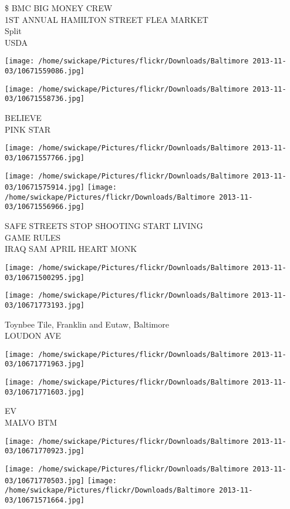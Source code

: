 \documentclass[10pt,letterpaper]{article}
\begin{document}
\$ BMC BIG MONEY CREW\\
1ST ANNUAL HAMILTON STREET FLEA MARKET\\
Split\\
USDA
\pagebreak

\texttt{[image: /home/swickape/Pictures/flickr/Downloads/Baltimore 2013-11-03/10671559086.jpg]}

\vspace{0.25in}
\texttt{[image: /home/swickape/Pictures/flickr/Downloads/Baltimore 2013-11-03/10671558736.jpg]}

BELIEVE\\
PINK STAR
\pagebreak

\texttt{[image: /home/swickape/Pictures/flickr/Downloads/Baltimore 2013-11-03/10671557766.jpg]}

\vspace{0.25in}
\texttt{[image: /home/swickape/Pictures/flickr/Downloads/Baltimore 2013-11-03/10671575914.jpg]}
\texttt{[image: /home/swickape/Pictures/flickr/Downloads/Baltimore 2013-11-03/10671556966.jpg]}

SAFE STREETS STOP SHOOTING START LIVING\\
GAME RULES\\
IRAQ SAM APRIL HEART MONK
\pagebreak

\texttt{[image: /home/swickape/Pictures/flickr/Downloads/Baltimore 2013-11-03/10671500295.jpg]}

\vspace{0.25in}
\texttt{[image: /home/swickape/Pictures/flickr/Downloads/Baltimore 2013-11-03/10671773193.jpg]}

Toynbee Tile, Franklin and Eutaw, Baltimore\\
LOUDON AVE
\pagebreak

\texttt{[image: /home/swickape/Pictures/flickr/Downloads/Baltimore 2013-11-03/10671771963.jpg]}

\vspace{0.25in}
\texttt{[image: /home/swickape/Pictures/flickr/Downloads/Baltimore 2013-11-03/10671771603.jpg]}

EV\\
MALVO BTM
\pagebreak

\texttt{[image: /home/swickape/Pictures/flickr/Downloads/Baltimore 2013-11-03/10671770923.jpg]}

\vspace{0.25in}
\texttt{[image: /home/swickape/Pictures/flickr/Downloads/Baltimore 2013-11-03/10671770503.jpg]}
\texttt{[image: /home/swickape/Pictures/flickr/Downloads/Baltimore 2013-11-03/10671571664.jpg]}
\end{document}
